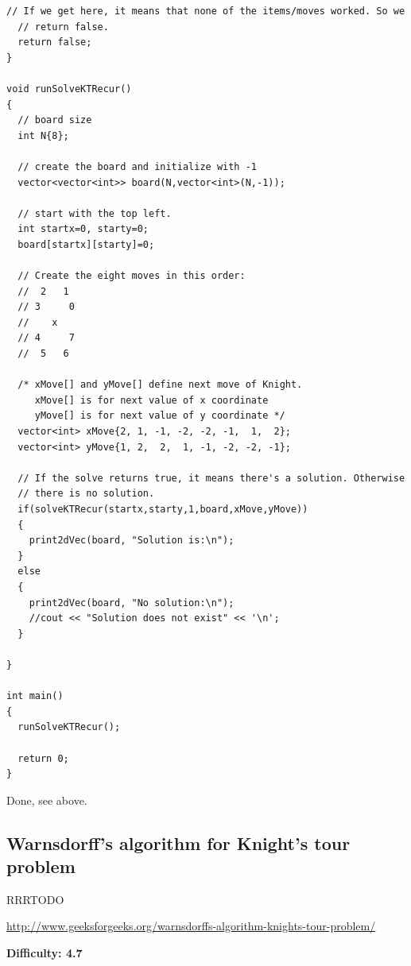 \begin{lstlisting}[style=raycppnewsnippet]
  // If we get here, it means that none of the items/moves worked. So we
  // return false.
  return false;
}

void runSolveKTRecur()
{
  // board size
  int N{8};
  
  // create the board and initialize with -1
  vector<vector<int>> board(N,vector<int>(N,-1));

  // start with the top left.
  int startx=0, starty=0;
  board[startx][starty]=0;

  // Create the eight moves in this order:
  //  2   1
  // 3     0
  //    x
  // 4     7
  //  5   6
  
  /* xMove[] and yMove[] define next move of Knight.
     xMove[] is for next value of x coordinate
     yMove[] is for next value of y coordinate */
  vector<int> xMove{2, 1, -1, -2, -2, -1,  1,  2};
  vector<int> yMove{1, 2,  2,  1, -1, -2, -2, -1};

  // If the solve returns true, it means there's a solution. Otherwise
  // there is no solution.
  if(solveKTRecur(startx,starty,1,board,xMove,yMove))
  {
    print2dVec(board, "Solution is:\n");
  }
  else
  {
    print2dVec(board, "No solution:\n");
    //cout << "Solution does not exist" << '\n';
  }

}

int main()
{
  runSolveKTRecur();

  return 0;
}
\end{lstlisting}

\RayNotesEnd

\textbf{}

Done, see above.



\subsection{Warnsdorff's algorithm for Knight's tour problem
  \label{secGFGBktrckKnightsTourWarnsdorff}}


RRRTODO

\url{http://www.geeksforgeeks.org/warnsdorffs-algorithm-knights-tour-problem/}

\textbf{Difficulty: 4.7}

\textbf{}

\RayNotesBegin



\RayNotesEnd


